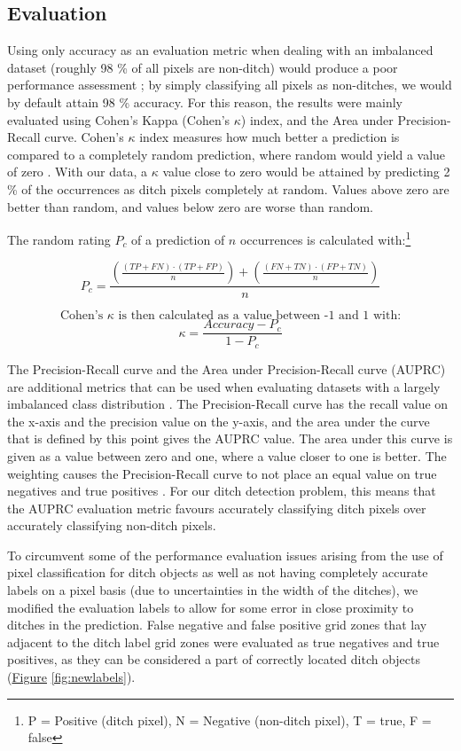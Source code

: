 \documentclass[]{interact}
\theoremstyle{plain}%
\theoremstyle{definition}
\theoremstyle{remark}
\begin{document}
\subsection{Evaluation} \label{evaluation}

Using only accuracy as an evaluation metric when dealing with an imbalanced dataset (roughly 98 \% of all pixels are non-ditch) would produce a poor performance assessment \citep{balanced}; by simply classifying all pixels as non-ditches, we would by default attain 98 \% accuracy. For this reason, the results were mainly evaluated using Cohen's Kappa (Cohen's $\kappa$) index, and the Area under Precision-Recall curve. Cohen's $\kappa$ index measures how much better a prediction is compared to a completely random prediction, where random would yield a value of zero \citep{kappa123}. With our data, a $\kappa$ value close to zero would be attained by predicting 2 \% of the occurrences as ditch pixels completely at random. Values above zero are better than random, and values below zero are worse than random.

The random rating $P_c$ of a prediction of $n$ occurrences is calculated with:\footnote{ P = Positive (ditch pixel), N = Negative (non-ditch pixel), T = true, F = false}

$$
P_c = \frac{\left(\frac{(TP + FN) \cdot (TP + FP)}{n}\right) + \left(\frac{(FN + TN) \cdot (FP + TN)}{n}\right)}{n}
$$

$$
\text{Cohen's } \kappa \text{ is then calculated as a value between -1 and 1 with:}
$$
$$\kappa = \frac{Accuracy - P_c}{1 - P_c}$$

The Precision-Recall curve and the Area under Precision-Recall curve (AUPRC) are additional metrics that can be used when evaluating datasets with a largely imbalanced class distribution \citep{precision_recall_curve}. The Precision-Recall curve has the recall value on the x-axis and the precision value on the y-axis, and the area under the curve that is defined by this point gives the AUPRC value. The area under this curve is given as a value between zero and one, where a value closer to one is better. The weighting causes the Precision-Recall curve to not place an equal value on true negatives and true positives \citep{precision_recall_curve}. For our ditch detection problem, this means that the AUPRC evaluation metric favours accurately classifying ditch pixels over accurately classifying non-ditch pixels.

To circumvent some of the performance evaluation issues arising from the use of pixel classification for ditch objects as well as not having completely accurate labels on a pixel basis (due to uncertainties in the width of the ditches), we modified the evaluation labels to allow for some error in close proximity to ditches in the prediction. False negative and false positive grid zones that lay adjacent to the ditch label grid zones were evaluated as true negatives and true positives, as they can be considered a part of correctly located ditch objects (\hyperref[fig:newlabels]{Figure} \ref{fig:newlabels}).
\end{document}
